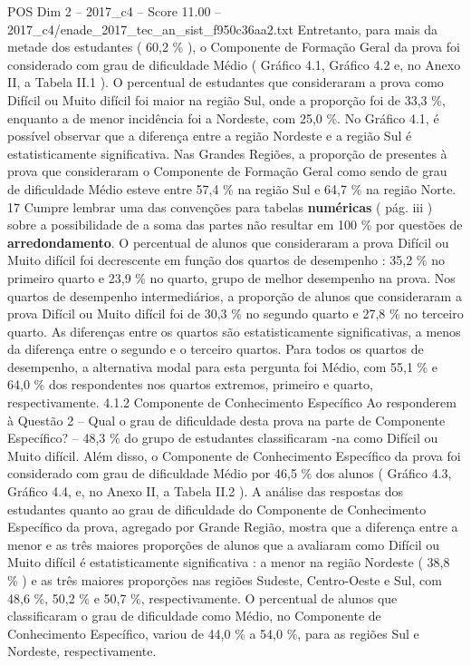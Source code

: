 \begin{textsample}{POS Dim 2 – 2017\_c4 – Score 11.00 – 2017\_c4/enade\_2017\_tec\_an\_sist\_f950c36aa2.txt}
Entretanto, para mais da metade dos estudantes ( 60,2 \% ), o Componente de Formação Geral da prova foi considerado com grau de dificuldade Médio ( Gráfico 4.1, Gráfico 4.2 e, no Anexo II, a Tabela II.1 ).
O percentual de estudantes que consideraram a prova como Difícil ou Muito difícil foi maior na região Sul, onde a proporção foi de 33,3 \%, enquanto a de menor incidência foi a Nordeste, com 25,0 \%.
No Gráfico 4.1, é possível observar que a diferença entre a região Nordeste e a região Sul é estatisticamente significativa.
Nas Grandes Regiões, a proporção de presentes à prova que consideraram o Componente de Formação Geral como sendo de grau de dificuldade Médio esteve entre 57,4 \% na região Sul e 64,7 \% na região Norte. 17 Cumpre lembrar uma das convenções para tabelas \textbf{numéricas} ( pág. iii ) sobre a possibilidade de a soma das partes não resultar em 100 \% por questões de \textbf{arredondamento}.
O percentual de alunos que consideraram a prova Difícil ou Muito difícil foi decrescente em função dos quartos de desempenho : 35,2 \% no primeiro quarto e 23,9 \% no quarto, grupo de melhor desempenho na prova.
Nos quartos de desempenho intermediários, a proporção de alunos que consideraram a prova Difícil ou Muito difícil foi de 30,3 \% no segundo quarto e 27,8 \% no terceiro quarto.
As diferenças entre os quartos são estatisticamente significativas, a menos da diferença entre o segundo e o terceiro quartos.
Para todos os quartos de desempenho, a alternativa modal para esta pergunta foi Médio, com 55,1 \% e 64,0 \% dos respondentes nos quartos extremos, primeiro e quarto, respectivamente. 4.1.2 Componente de Conhecimento Específico Ao responderem à Questão 2 – Qual o grau de dificuldade desta prova na parte de Componente Específico? – 48,3 \% do grupo de estudantes classificaram -na como Difícil ou Muito difícil.
Além disso, o Componente de Conhecimento Específico da prova foi considerado com grau de dificuldade Médio por 46,5 \% dos alunos ( Gráfico 4.3, Gráfico 4.4, e, no Anexo II, a Tabela II.2 ).
A análise das respostas dos estudantes quanto ao grau de dificuldade do Componente de Conhecimento Específico da prova, agregado por Grande Região, mostra que a diferença entre a menor e as três maiores proporções de alunos que a avaliaram como Difícil ou Muito difícil é estatisticamente significativa : a menor na região Nordeste ( 38,8 \% ) e as três maiores proporções nas regiões Sudeste, Centro-Oeste e Sul, com 48,6 \%, 50,2 \% e 50,7 \%, respectivamente.
O percentual de alunos que classificaram o grau de dificuldade como Médio, no Componente de Conhecimento Específico, variou de 44,0 \% a 54,0 \%, para as regiões Sul e Nordeste, respectivamente.

\end{textsample}
